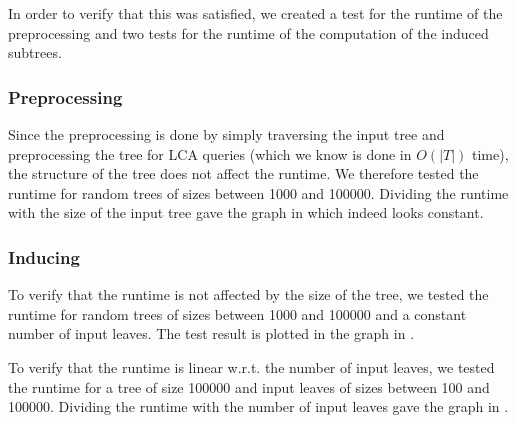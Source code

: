 In order to verify that this was satisfied, we created a test for the runtime of the preprocessing and two tests for the runtime of the computation of the induced subtrees.

\subsubsection{Preprocessing}
Since the preprocessing is done by simply traversing the input tree and preprocessing the tree for LCA queries (which we know is done in $O(|T|)$ time), the structure of the tree does not affect the runtime. We therefore tested the runtime for random trees of sizes between 1000 and 100000. Dividing the runtime with the size of the input tree gave the graph in  which indeed looks constant.

\subsubsection{Inducing}
To verify that the runtime is not affected by the size of the tree, we tested the runtime for random trees of sizes between 1000 and 100000 and a constant number of input leaves. The test result is plotted in the graph in .

To verify that the runtime is linear w.r.t. the number of input leaves, we tested the runtime for a tree of size 100000 and input leaves of sizes between 100 and 100000. Dividing the runtime with the number of input leaves gave the graph in .



